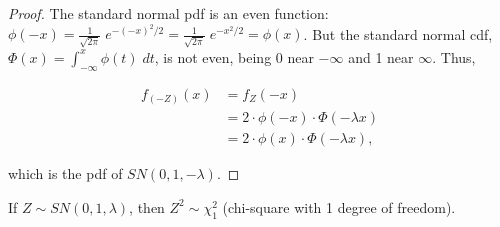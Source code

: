 \documentclass{article}
\begin{document}
\begin{proof}
  The standard normal pdf is an even function: $\phi(-x) =
  \frac{1}{\sqrt{2\pi}}\;e^{-(-x)^2/2} = \frac{1}{\sqrt{2\pi}}\;e^{-x^2/2} =
  \phi(x)$. But the standard normal cdf, \thinspace $\Phi(x) = \int_{-\infty}^x
  \phi(t)\;dt$, \thinspace is not even, being 0 near $-\infty$ and 1 near
  $\infty$. Thus,
  
  \begin{align*}
    f_{(-Z)}(x) &= f_Z(-x) \\
    & = 2 \cdot \phi(-x) \cdot \Phi (-\lambda x) \\
    & = 2 \cdot \phi(x) \cdot \Phi (-\lambda x),
  \end{align*}

  which is the pdf of $SN(0, 1, -\lambda)$.
\end{proof}

\begin{property} \label{prop:2}
  If $Z \sim SN(0, 1, \lambda)$, then $Z^2 \sim \chi^2_1$ (chi-square with 1 degree of freedom).
\end{property}
\end{document}
